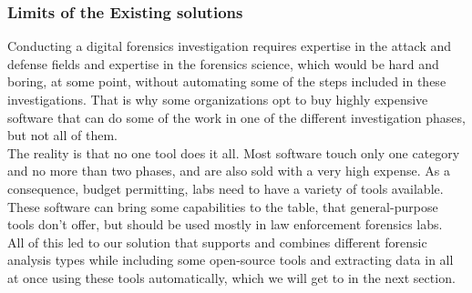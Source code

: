 \subsubsection{Limits of the Existing solutions}
Conducting a digital forensics investigation requires expertise in the attack and defense fields and expertise in the forensics science, which would be hard and boring, at some point, without automating some of the steps included in these investigations. That is why some organizations opt to buy highly expensive software that can do some of the work in one of the different investigation phases, but not all of them.\\
The reality is that no one tool does it all. Most software touch only one category and no more than two phases, and are also sold with a very high expense. As a consequence, budget permitting, labs need to have a variety of tools available. These software can bring some capabilities to the table, that general-purpose tools don't offer, but should be used mostly in law enforcement forensics labs.\\
All of this led to our solution that supports and combines different forensic analysis types while including some open-source tools and extracting data in all at once using these tools automatically, which we will get to in the next section.

